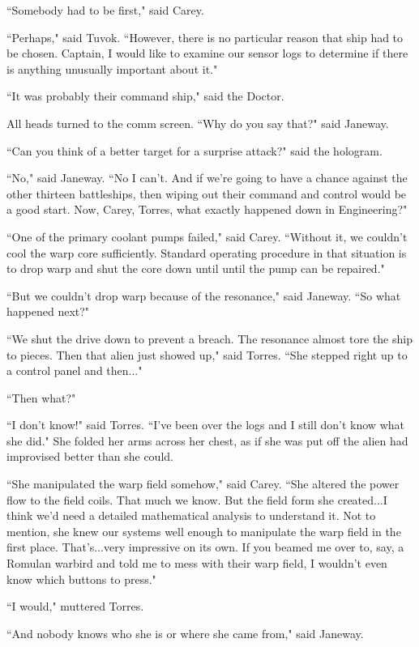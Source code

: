 \documentclass[twoside,letterpaper,12pt]{memoir}
\begin{document}
``Somebody had to be first," said Carey. 

``Perhaps," said Tuvok. ``However, there is no particular reason that ship had to be chosen. Captain, I would like to examine our sensor logs to determine if there is anything unusually important about it." 

``It was probably their command ship," said the Doctor. 

All heads turned to the comm screen. ``Why do you say that?" said Janeway. 

``Can you think of a better target for a surprise attack?" said the hologram. 

``No," said Janeway. ``No I can't. And if we're going to have a chance against the other thirteen battleships, then wiping out their command and control would be a good start. Now, Carey, Torres, what exactly happened down in Engineering?" 

``One of the primary coolant pumps failed," said Carey. ``Without it, we couldn't cool the warp core sufficiently. Standard operating procedure in that situation is to drop warp and shut the core down until until the pump can be repaired." 

``But we couldn't drop warp because of the resonance," said Janeway. ``So what happened next?" 

``We shut the drive down to prevent a breach. The resonance almost tore the ship to pieces. Then that alien just showed up," said Torres. ``She stepped right up to a control panel and then..." 

``Then what?" 

``I don't know!" said Torres. ``I've been over the logs and I still don't know what she did." She folded her arms across her chest, as if she was put off the alien had improvised better than she could. 

``She manipulated the warp field somehow," said Carey. ``She altered the power flow to the field coils. That much we know. But the field form she created...I think we'd need a detailed mathematical analysis to understand it. Not to mention, she knew our systems well enough to manipulate the warp field in the first place. That's...very impressive on its own. If you beamed me over to, say, a Romulan warbird and told me to mess with their warp field, I wouldn't even know which buttons to press." 

``I would," muttered Torres. 

``And nobody knows who she is or where she came from," said Janeway. 
\end{document}
